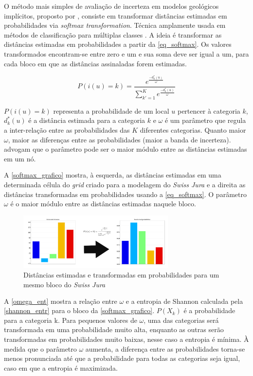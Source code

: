 O método mais simples de avaliação de incerteza em modelos geológicos implícitos, proposto por , consiste em transformar distâncias estimadas em probabilidades via \textit{softmax transformation}. Técnica amplamente usada em métodos de classificação para múltiplas classes \cite{mccullaghgeneralizedlinear}. A ideia é transformar as distâncias estimadas em probabilidades a partir da \autoref{eq_softmax}. Os valores transformados encontram-se entre zero e um e sua soma deve ser igual a um, para cada bloco em que as distâncias assinaladas forem estimadas.

\begin{equation}
	P(i(u)=k)=\frac{e^\frac{-d^*_k(u)}{\omega}}{\sum_{k'=1}^{K}e^\frac{-d^*_k(u)}{\omega}}
    \label{eq_softmax}
\end{equation}

$P(i(u)=k)$ representa a probabilidade de um local $u$ pertencer à categoria $k$, $d^*_k(u)$ é a distância estimada para a categoria $k$ e $\omega$ é um parâmetro que regula a inter-relação entre as probabilidades das $K$ diferentes categorias. Quanto maior $\omega$, maior as diferenças entre as probabilidades (maior a banda de incerteza).  advogam que o parâmetro pode ser o maior módulo entre as distâncias estimadas em um nó. 

A \autoref{softmax_grafico} mostra, à esquerda, as distâncias estimadas em uma determinada célula do \textit{grid} criado para a modelagem do \textit{Swiss Jura} e a direita as distâncias transformadas em probabilidades usando a \autoref{eq_softmax}. O parâmetro $\omega$ é o maior módulo entre as distâncias estimadas naquele bloco.

\begin{figure}[H]
	\caption{\label{softmax_grafico}Distâncias estimadas e transformadas em probabilidades para um mesmo bloco do \textit{Swiss Jura}}
	\centering
		\includegraphics[width=0.7\textwidth]{capitulo_2/imagens/dis_to_probs.png}
\end{figure}

A \autoref{omega_ent} mostra a relação entre $\omega$ e a entropia de Shannon \cite{shannon1948mathematical} calculada pela \autoref{shannon_entr} para o bloco da \autoref{softmax_grafico}. $P(X_k)$ é a probabilidade para a categoria k. Para pequenos valores de $\omega$, uma das categorias será transformada em uma probabilidade muito alta, enquanto as outras serão transformadas em probabilidades muito baixas, nesse caso a entropia é mínima. À medida que o parâmetro $\omega$ aumenta, a diferença entre as probabilidades torna-se menos pronunciada até que a probabilidade para todas as categorias seja igual, caso em que a entropia é maximizada.

